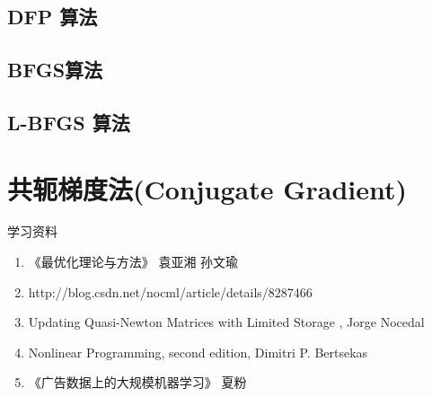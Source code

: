 \documentclass[a4paper,10pt]{ctexbook}
\begin{document}
\subsection{DFP 算法}
\subsection{BFGS算法}
\subsection{L-BFGS 算法}


\section{共轭梯度法(Conjugate Gradient)}
学习资料
\begin{enumerate}
\item《最优化理论与方法》 袁亚湘 孙文瑜
\item http://blog.csdn.net/nocml/article/details/8287466
\item Updating Quasi-Newton Matrices with Limited Storage , Jorge Nocedal
\item Nonlinear Programming, second edition, Dimitri P. Bertsekas
\item《广告数据上的大规模机器学习》  夏粉
\end{enumerate}

\ifx\mlbook\undefined
    
\end{document}
